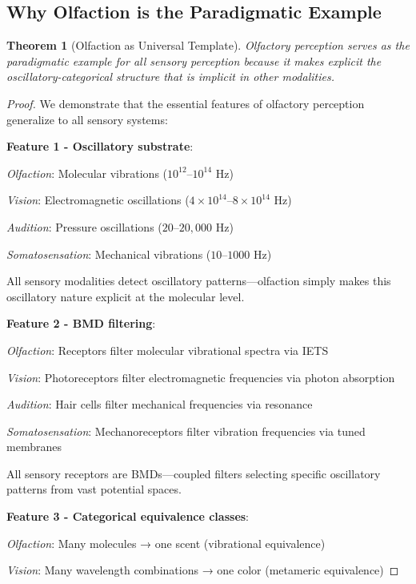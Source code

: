\documentclass[11pt]{article}
\newtheorem{theorem}{Theorem}[section]
\theoremstyle{remark}
\begin{document}
\subsection{Why Olfaction is the Paradigmatic Example}

\begin{theorem}[Olfaction as Universal Template]
\label{thm:olfaction_paradigm}
Olfactory perception serves as the paradigmatic example for \textit{all} sensory perception because it makes explicit the oscillatory-categorical structure that is implicit in other modalities.
\end{theorem}

\begin{proof}
We demonstrate that the essential features of olfactory perception generalize to all sensory systems:

\textbf{Feature 1 - Oscillatory substrate}:

\textit{Olfaction}: Molecular vibrations ($10^{12}$--$10^{14}$ Hz)

\textit{Vision}: Electromagnetic oscillations ($4 \times 10^{14}$--$8 \times 10^{14}$ Hz)

\textit{Audition}: Pressure oscillations ($20$--$20,000$ Hz)

\textit{Somatosensation}: Mechanical vibrations ($10$--$1000$ Hz)

All sensory modalities detect oscillatory patterns—olfaction simply makes this oscillatory nature explicit at the molecular level.

\textbf{Feature 2 - BMD filtering}:

\textit{Olfaction}: Receptors filter molecular vibrational spectra via IETS

\textit{Vision}: Photoreceptors filter electromagnetic frequencies via photon absorption

\textit{Audition}: Hair cells filter mechanical frequencies via resonance

\textit{Somatosensation}: Mechanoreceptors filter vibration frequencies via tuned membranes

All sensory receptors are BMDs—coupled filters selecting specific oscillatory patterns from vast potential spaces.

\textbf{Feature 3 - Categorical equivalence classes}:

\textit{Olfaction}: Many molecules → one scent (vibrational equivalence)

\textit{Vision}: Many wavelength combinations → one color (metameric equivalence)


\end{proof}
\end{document}
